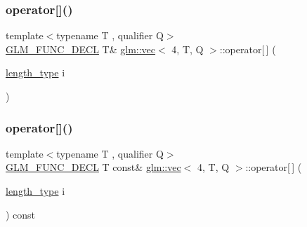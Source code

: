 \mbox{\label{structglm_1_1vec_3_014_00_01_t_00_01_q_01_4_a49fc7a64b8898f20a4f223a41c97eaef}} 
\subsubsection{\texorpdfstring{operator[]()}{operator[]()}\hspace{0.1cm}{\footnotesize\ttfamily [1/2]}}
{\footnotesize\ttfamily template$<$typename T , qualifier Q$>$ \\
\hyperlink{setup_8hpp_ab2d052de21a70539923e9bcbf6e83a51}{G\+L\+M\+\_\+\+F\+U\+N\+C\+\_\+\+D\+E\+CL} T\& \hyperlink{structglm_1_1vec}{glm\+::vec}$<$ 4, T, Q $>$\+::operator\mbox{[}$\,$\mbox{]} (\begin{DoxyParamCaption}\item[{\hyperlink{structglm_1_1vec_3_014_00_01_t_00_01_q_01_4_af1c8f56963141951f4a4724b47e072d9}{length\+\_\+type}}]{i }\end{DoxyParamCaption})}

\mbox{\label{structglm_1_1vec_3_014_00_01_t_00_01_q_01_4_adea890cef20b856644085cc9fb20a2a2}} 
\subsubsection{\texorpdfstring{operator[]()}{operator[]()}\hspace{0.1cm}{\footnotesize\ttfamily [2/2]}}
{\footnotesize\ttfamily template$<$typename T , qualifier Q$>$ \\
\hyperlink{setup_8hpp_ab2d052de21a70539923e9bcbf6e83a51}{G\+L\+M\+\_\+\+F\+U\+N\+C\+\_\+\+D\+E\+CL} T const\& \hyperlink{structglm_1_1vec}{glm\+::vec}$<$ 4, T, Q $>$\+::operator\mbox{[}$\,$\mbox{]} (\begin{DoxyParamCaption}\item[{\hyperlink{structglm_1_1vec_3_014_00_01_t_00_01_q_01_4_af1c8f56963141951f4a4724b47e072d9}{length\+\_\+type}}]{i }\end{DoxyParamCaption}) const}


